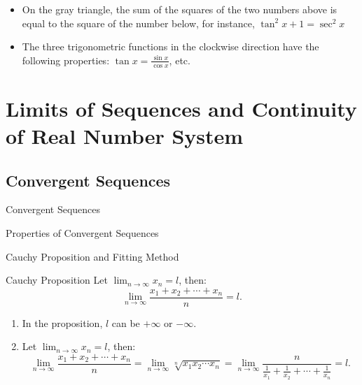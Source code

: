 \documentclass[11pt]{../../TexTemplate/elegantbook}
\begin{document}
\begin{remark}
    \begin{itemize}
        \item On the gray triangle, the sum of the squares of the two numbers above is equal to the square of the number below,
            for instance, \(\tan^{2} x + 1 = \sec^{2}x\)
        \item The three trigonometric functions in the clockwise direction have the following properties: 
            $\tan x = \frac{\sin x}{\cos x}$, etc.
    \end{itemize}
\end{remark}



\chapter{Limits of Sequences and Continuity of Real Number System} 
\section{Convergent Sequences}
\begin{leftbarTitle}{Convergent Sequences}\end{leftbarTitle}

\begin{leftbarTitle}{Properties of Convergent Sequences}\end{leftbarTitle}



\begin{leftbarTitle}{Cauchy Proposition and Fitting Method}\end{leftbarTitle}
\begin{proposition}{Cauchy Proposition}\label{prop:Cauchy Proposition}
    Let \(\lim_{n \to \infty} x_n = l\), then:
    \[
        \lim_{n \to \infty} \frac{x_{1}+x_{2}+ \cdots +x_{n}}{n} = l.
    \]
\end{proposition}

\begin{note}
    \begin{enumerate}
        \item In the proposition, \(l\) can be \(+\infty\) or \(-\infty\).
        \item Let \(\lim_{n \to \infty} x_n = l\), then:
            \[
                \lim_{n \to \infty}\frac{x_{1}+x_{2}+ \cdots +x_{n}}{n}
                =\lim_{n \to \infty} \sqrt[n]{x_{1} x_{2} \cdots x_{n}} 
                =\lim_{n \to \infty} \frac{n}{\frac{1}{x_{1}} + \frac{1}{x_{2}} + \cdots + \frac{1}{x_{n}}}
                = l.
            \]
    \end{enumerate}
\end{note}
\end{document}
